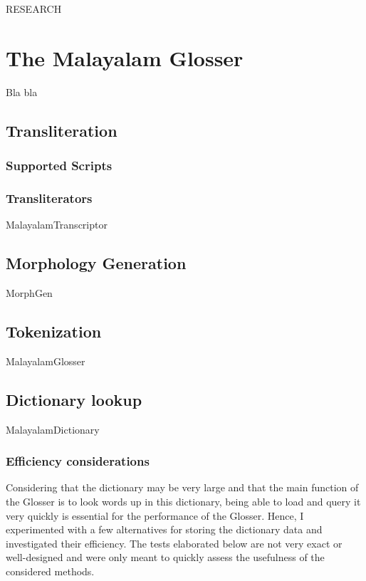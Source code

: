 \documentclass[a4paper]{article}
\begin{document}
RESEARCH

\section{The Malayalam Glosser}

Bla bla

\subsection{Transliteration}

\subsubsection{Supported Scripts}

\subsubsection{Transliterators}

MalayalamTranscriptor

\subsection{Morphology Generation}

MorphGen

\subsection{Tokenization}

MalayalamGlosser

\subsection{Dictionary lookup}

MalayalamDictionary

\subsubsection{Efficiency considerations}

Considering that the dictionary may be very large and that the main function of the Glosser is to look words up in this dictionary, being able to load and query it very quickly is essential for the performance of the Glosser. Hence, I experimented with a few alternatives for storing the dictionary data and investigated their efficiency. The tests elaborated below are not very exact or well-designed and were only meant to quickly assess the usefulness of the considered methods.
\end{document}
